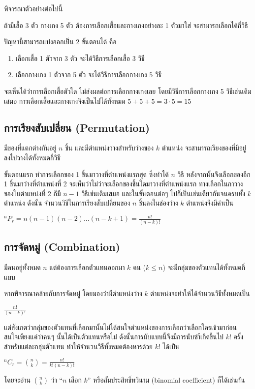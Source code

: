 พิจารณาตัวอย่างต่อไปนี้
\begin{example}
ถ้ามีเสื้อ 3 ตัว กางเกง 5 ตัว ต้องการเลือกเสื้อและกางเกงอย่างละ 1 ตัวมาใส่ จะสามารถเลือกได้กี่วิธี

ปัญหานี้สามารถแบ่งออกเป็น 2 ขั้นตอนได้ คือ
\begin{enumerate}
\item เลือกเสื้อ 1 ตัวจาก 3 ตัว จะได้วิธีการเลือกเสื้อ 3 วิธี
\item เลือกกางเกง 1 ตัวจาก 5 ตัว จะได้วิธีการเลือกกางเกง 5 วิธี
\end{enumerate}
จะเห็นได้ว่าการเลือกเสื้อตัวใด ไม่ส่งผลต่อการเลือกกางเกงเลย โดยมีวิธีการเลือกกางเกง 5 วิธีเช่นเดิมเสมอ การเลือกเสื้อและกางเกงจึงเป็นไปได้ทั้งหมด $5+5+5 = 3 \cdot 5 = 15$
\end{example}

\subsection{การเรียงสับเปลี่ยน (Permutation)}
\begin{example}
มีของที่แตกต่างกันอยู่ $n$ ชิ้น และมีตำแหน่งว่างสำหรับว่างของ $k$ ตำแหน่ง จะสามารถเรียงของที่มีอยู่ลงไปวางได้ทั้งหมดกี่วิธี

ขั้นตอนแรก ทำการเลือกของ 1 ชิ้นมาวางที่ตำแหน่งแรกสุด ซึ่งทำได้ $n$ วิธี หลังจากนั้นจึงเลือกของอีก 1 ชิ้นมาว่างที่ตำแหน่งที่ 2 จะเห็นว่าไม่ว่าจะเลือกของชิ้นใดมาวางที่ตำแหน่งแรก ทางเลือกในกาวางของในตำแหน่งที่ 2 ก็มี $n-1$ วิธีเช่นเดิมเสมอ และในขั้นตอนต่อๆ ไปก็เป็นเช่นเดียวกันจนครบทั้ง $k$ ตำแหน่ง ดังนั้น จำนวนวิธีในการเรียงสับเปลี่ยนของ $n$ ชิ้นลงในช่องว่าง $k$ ตำแหน่งจึงมีค่าเป็น
\begin{center}
$^{n}P_{r}=n(n-1)(n-2)...(n-k+1) = \frac{n!}{(n-k)!}$
\end{center}
\end{example}

\subsection{การจัดหมู่ (Combination)}
\begin{example}
มีคนอยู่ทั้งหมด $n$ แต่ต้องการเลือกตัวแทนออกมา $k$ คน ($k \leq n$) จะมีกลุ่มของตัวแทนได้ทั้งหมดกี่แบบ

หากพิจารณาคล้ายกับการจัดหมู่ โดยมองว่ามีตำแหน่งว่าง $k$ ตำแหน่งจะทำให้ได้จำนวนวิธีทั้งหมดเป็น
\begin{center}
$\frac{n!}{(n-k)!}$
\end{center}
แต่สังเกตว่ากลุ่มของตัวแทนที่เลือกมานั้นไม่ได้สนใจตำแหน่งของการเลือกว่าเลือกใครเข้ามาก่อน สนใจเพียงแค่ว่าคนๆ นั้นได้เป็นตัวแทนหรือไม่ ดังนั้นการนับแบบนี้จึงมีการนับซำ้เกิดขึ้นไป $k!$ ครั้งสำหรับแต่ละกลุ่มตัวแทน ทำให้จำนวนวิธีทั้งหมดต้องหารด้วย $k!$ ได้เป็น
\begin{center}
$^nC_r = \binom{n}{k} = \frac{n!}{k!(n-k)!}$
\end{center}
โดยจะอ่าน $\binom{n}{k}$ ว่า ``$n$ เลือก $k$'' หรือสัมประสิทธิ์ทวินาม (binomial coefficient) ก็ได้เช่นกัน
\end{example}

